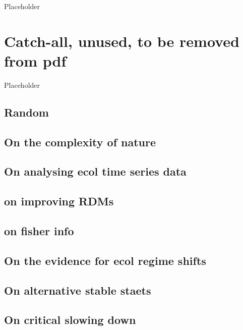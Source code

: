 \documentclass[12pt,twoside,openany]{reedthesis}
\begin{document}
Placeholder

\chapter*{Catch-all, unused, to be removed from
pdf}\label{catch-all-unused-to-be-removed-from-pdf}

Placeholder

\section{Random}\label{random}

\section{On the complexity of nature}\label{on-the-complexity-of-nature}

\section{On analysing ecol time series
data}\label{on-analysing-ecol-time-series-data}

\section{on improving RDMs}\label{on-improving-rdms}

\section{on fisher info}\label{on-fisher-info}

\section{On the evidence for ecol regime
shifts}\label{on-the-evidence-for-ecol-regime-shifts}

\section{On alternative stable
staets}\label{on-alternative-stable-staets}

\section{On critical slowing down}\label{on-critical-slowing-down}
\end{document}
